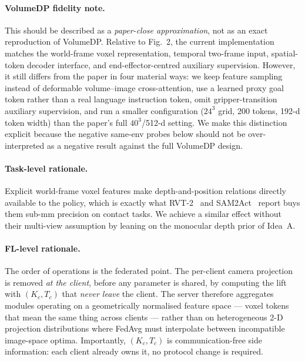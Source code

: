 \documentclass{article}
\begin{document}
\paragraph{VolumeDP fidelity note.}
This should be described as a \emph{paper-close approximation},
not as an exact reproduction of VolumeDP. Relative to Fig.~2, the
current implementation matches the world-frame voxel
representation, temporal two-frame input, spatial-token decoder
interface, and end-effector-centred auxiliary supervision.
However, it still differs from the paper in four material ways:
we keep feature sampling instead of deformable volume--image
cross-attention, use a learned proxy goal token rather than a real
language instruction token, omit gripper-transition auxiliary
supervision, and run a smaller configuration ($24^3$ grid, 200
tokens, 192-d token width) than the paper's full $40^3$/512-d
setting. We make this distinction explicit because the negative
same-env probes below should not be over-interpreted as a negative
result against the full VolumeDP design.

\paragraph{Task-level rationale.}
Explicit world-frame voxel features make depth-and-position
relations directly available to the policy, which is exactly
what RVT-2~\cite{rvt2} and SAM2Act~\cite{sam2act} report buys them
sub-mm precision on contact tasks. We achieve a similar effect
without their multi-view assumption by leaning on the monocular
depth prior of Idea~A.

\paragraph{FL-level rationale.}
The order of operations is the federated point. The per-client
camera projection is removed \emph{at the client}, before any
parameter is shared, by computing the lift with $(K_c, T_c)$ that
\emph{never leave} the client. The server therefore aggregates
modules operating on a geometrically normalised feature space ---
voxel tokens that mean the same thing across clients --- rather
than on heterogeneous 2-D projection distributions where FedAvg
must interpolate between incompatible image-space optima.
Importantly, $(K_c, T_c)$ is communication-free side information:
each client already owns it, no protocol change is required.
\end{document}
